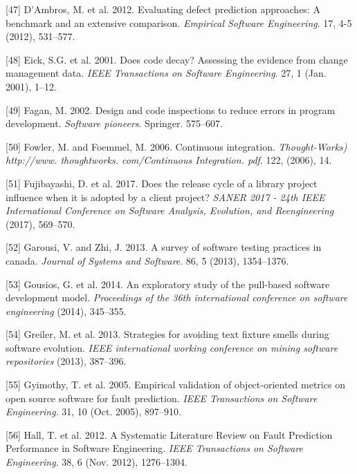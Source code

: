 \documentclass[]{book}
\begin{document}
\hypertarget{ref-DAmbros2012}{}
{[}47{]} D'Ambros, M. et al. 2012. Evaluating defect prediction
approaches: A benchmark and an extensive comparison. \emph{Empirical
Software Engineering}. 17, 4-5 (2012), 531--577.

\hypertarget{ref-eick2001}{}
{[}48{]} Eick, S.G. et al. 2001. Does code decay? Assessing the evidence
from change management data. \emph{IEEE Transactions on Software
Engineering}. 27, 1 (Jan. 2001), 1--12.

\hypertarget{ref-fagan2002design}{}
{[}49{]} Fagan, M. 2002. Design and code inspections to reduce errors in
program development. \emph{Software pioneers}. Springer. 575--607.

\hypertarget{ref-fowler2006continuous}{}
{[}50{]} Fowler, M. and Foemmel, M. 2006. Continuous integration.
\emph{Thought-Works) http://www. thoughtworks. com/Continuous
Integration. pdf}. 122, (2006), 14.

\hypertarget{ref-fujibayashi2017a}{}
{[}51{]} Fujibayashi, D. et al. 2017. Does the release cycle of a
library project influence when it is adopted by a client project?
\emph{SANER 2017 - 24th IEEE International Conference on Software
Analysis, Evolution, and Reengineering} (2017), 569--570.

\hypertarget{ref-GAROUSI20131354}{}
{[}52{]} Garousi, V. and Zhi, J. 2013. A survey of software testing
practices in canada. \emph{Journal of Systems and Software}. 86, 5
(2013), 1354--1376.

\hypertarget{ref-gousios2014exploratory}{}
{[}53{]} Gousios, G. et al. 2014. An exploratory study of the pull-based
software development model. \emph{Proceedings of the 36th international
conference on software engineering} (2014), 345--355.

\hypertarget{ref-greiler2013}{}
{[}54{]} Greiler, M. et al. 2013. Strategies for avoiding text fixture
smells during software evolution. \emph{IEEE international working
conference on mining software repositories} (2013), 387--396.

\hypertarget{ref-Gyimothy2005}{}
{[}55{]} Gyimothy, T. et al. 2005. Empirical validation of
object-oriented metrics on open source software for fault prediction.
\emph{IEEE Transactions on Software Engineering}. 31, 10 (Oct. 2005),
897--910.

\hypertarget{ref-Hall2012}{}
{[}56{]} Hall, T. et al. 2012. A Systematic Literature Review on Fault
Prediction Performance in Software Engineering. \emph{IEEE Transactions
on Software Engineering}. 38, 6 (Nov. 2012), 1276--1304.
\end{document}
